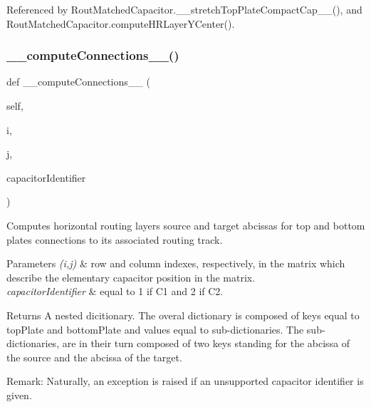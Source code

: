 Referenced by Rout\+Matched\+Capacitor.\+\_\+\+\_\+stretch\+Top\+Plate\+Compact\+Cap\+\_\+\+\_\+(), and Rout\+Matched\+Capacitor.\+compute\+H\+R\+Layer\+Y\+Center().

\mbox{\label{classpython_1_1capacitorrouted_1_1RoutMatchedCapacitor_ab7dd108892c643c3cc0a5b3118152097}} 
\subsubsection{\texorpdfstring{\+\_\+\+\_\+compute\+Connections\+\_\+\+\_\+()}{\_\_computeConnections\_\_()}}
{\footnotesize\ttfamily def \+\_\+\+\_\+compute\+Connections\+\_\+\+\_\+ (\begin{DoxyParamCaption}\item[{}]{self,  }\item[{}]{i,  }\item[{}]{j,  }\item[{}]{capacitor\+Identifier }\end{DoxyParamCaption})}



Computes horizontal routing layers source and target abcissas for top and bottom plates connections to its associated routing track. 


\begin{DoxyParams}{Parameters}
{\em (i,j)} & row and column indexes, respectively, in the matrix which describe the elementary capacitor position in the matrix. \\
\hline
{\em capacitor\+Identifier} & equal to \textquotesingle{}1\textquotesingle{} if C1 and \textquotesingle{}2\textquotesingle{} if C2. \\
\hline
\end{DoxyParams}
\begin{DoxyReturn}{Returns}
A nested dicitionary. The overal dictionary is composed of keys equal to {\ttfamily top\+Plate} and  bottom\+Plate and values equal to sub-\/dictionaries. The sub-\/dictionaries, are in their turn composed of two keys standing for the abcissa of the source and the abcissa of the target. 
\end{DoxyReturn}
\begin{DoxyParagraph}{Remark\+: Naturally, an exception is raised if an unsupported capacitor identifier is given. }

\end{DoxyParagraph}


